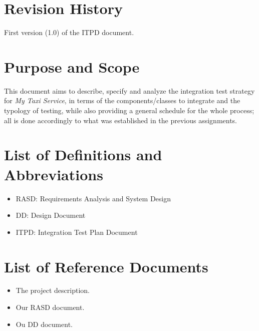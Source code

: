
\section{Revision History}
First version (1.0) of the ITPD document.
\section{Purpose and Scope}
This document aims to describe, specify and analyze the integration test strategy for \textit{My Taxi Service}, 
in terms of the components/classes to integrate and the typology of testing, while also providing a 
general schedule for the whole process; all is done accordingly to what was established in the previous assignments. \\


\section{List of Definitions and Abbreviations}
\begin{itemize}
 \item RASD: Requirements Analysis and System Design
 \item DD: Design Document
\item ITPD: Integration Test Plan Document
\end{itemize}

\section{List of Reference Documents}
\begin{itemize}
\item The project description.
\item Our RASD document.
\item Ou DD document.
\end{itemize}